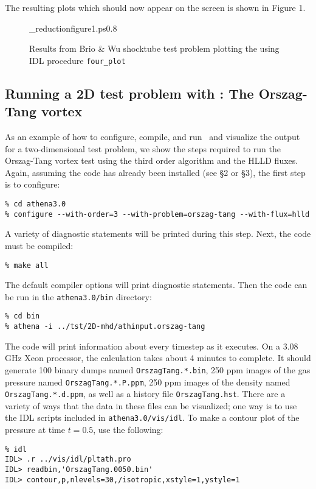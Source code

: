 The resulting plots which should now appear on the screen is shown in Figure 1. 

\begin{figure}[htb!]
\plotone_reduction{figure1.ps}{0.8}
\caption{Results from Brio \& Wu shocktube test problem plotting the using
IDL procedure {\tt four\_plot}}
\end{figure}

\subsection{Running a 2D test problem with \ath: The Orszag-Tang vortex}

As an example of how to configure, compile, and run \ath\ and visualize
the output for a two-dimensional test problem, we show the steps required
to run the Orszag-Tang vortex test using the third order algorithm and the
HLLD fluxes.
Again, assuming the code has already been
installed (see \S2 or \S3), the first step is to configure:
\begin{verbatim}
% cd athena3.0
% configure --with-order=3 --with-problem=orszag-tang --with-flux=hlld
\end{verbatim}
A variety of diagnostic statements will be printed during
this step.  Next, the code must be compiled:
\begin{verbatim}
% make all
\end{verbatim}
The default compiler options will print diagnostic statements.  Then
the code can be run in the {\tt athena3.0/bin} directory:
\begin{verbatim}
% cd bin
% athena -i ../tst/2D-mhd/athinput.orszag-tang
\end{verbatim}
The code will print information about every timestep as it executes.  On a 
3.08 GHz Xeon processor, the calculation takes about 4 minutes to complete.  It
should generate 100 binary dumps named {\tt OrszagTang.*.bin}, 250 ppm 
images of the gas pressure named {\tt OrszagTang.*.P.ppm}, 250 ppm
images of the density named {\tt OrszagTang.*.d.ppm},
as well as a history file {\tt OrszagTang.hst}.  There
are a variety of ways that the data in these files can be visualized; one
way is to use the IDL scripts included in {\tt athena3.0/vis/idl}.  To make a
contour plot of the pressure at time $t=0.5$, use the following:
\begin{verbatim}
% idl
IDL> .r ../vis/idl/pltath.pro
IDL> readbin,'OrszagTang.0050.bin'
IDL> contour,p,nlevels=30,/isotropic,xstyle=1,ystyle=1
\end{verbatim}

